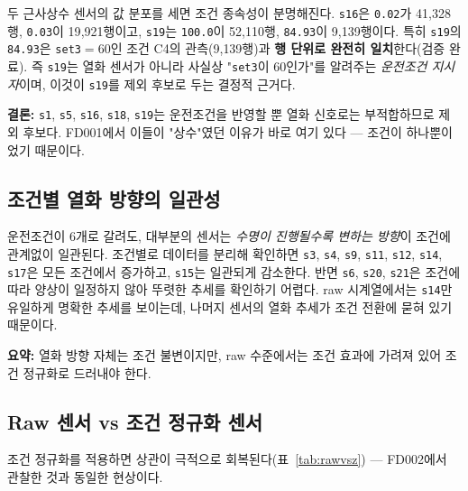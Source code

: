 \documentclass[11pt]{article}
\begin{document}
두 근사상수 센서의 값 분포를 세면 조건 종속성이 분명해진다.
\texttt{s16}은 \texttt{0.02}가 41{,}328행, \texttt{0.03}이 19{,}921행이고,
\texttt{s19}는 \texttt{100.0}이 52{,}110행, \texttt{84.93}이 9{,}139행이다.
특히 \texttt{s19}의 \texttt{84.93}은 \texttt{set3}$=60$인 조건 C4의 관측(9{,}139행)과 \textbf{행 단위로 완전히 일치}한다(검증 완료).
즉 \texttt{s19}는 열화 센서가 아니라 사실상 "\texttt{set3}이 60인가"를 알려주는 \emph{운전조건 지시자}이며, 이것이 \texttt{s19}를 제외 후보로 두는 결정적 근거다.

\textbf{결론:} \texttt{s1}, \texttt{s5}, \texttt{s16}, \texttt{s18}, \texttt{s19}는 운전조건을 반영할 뿐 열화 신호로는 부적합하므로 제외 후보다.
FD001에서 이들이 "상수"였던 이유가 바로 여기 있다 — 조건이 하나뿐이었기 때문이다.

\subsection{조건별 열화 방향의 일관성}

운전조건이 6개로 갈려도, 대부분의 센서는 \emph{수명이 진행될수록 변하는 방향}이 조건에 관계없이 일관된다.
조건별로 데이터를 분리해 확인하면 \texttt{s3}, \texttt{s4}, \texttt{s9}, \texttt{s11}, \texttt{s12}, \texttt{s14}, \texttt{s17}은 모든 조건에서 증가하고, \texttt{s15}는 일관되게 감소한다.
반면 \texttt{s6}, \texttt{s20}, \texttt{s21}은 조건에 따라 양상이 일정하지 않아 뚜렷한 추세를 확인하기 어렵다.
raw 시계열에서는 \texttt{s14}만 유일하게 명확한 추세를 보이는데, 나머지 센서의 열화 추세가 조건 전환에 묻혀 있기 때문이다.

\textbf{요약:} 열화 방향 자체는 조건 불변이지만, raw 수준에서는 조건 효과에 가려져 있어 조건 정규화로 드러내야 한다.

\subsection{Raw 센서 vs 조건 정규화 센서}

조건 정규화를 적용하면 상관이 극적으로 회복된다(표~\ref{tab:rawvsz}) — FD002에서 관찰한 것과 동일한 현상이다.
\end{document}
